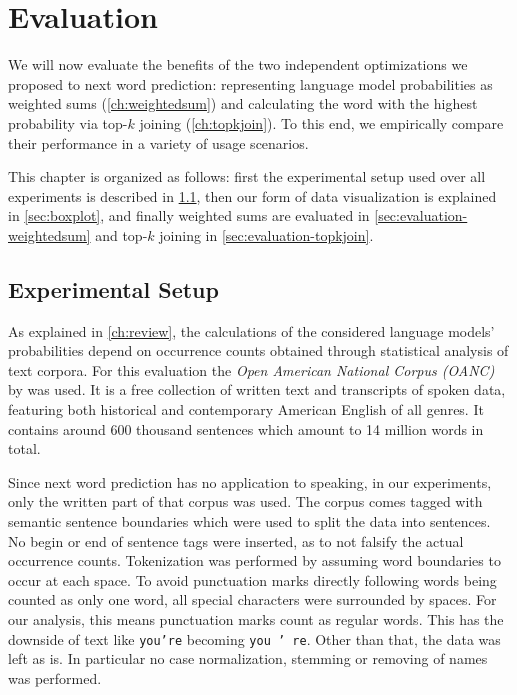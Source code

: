 \chapter{Evaluation}
\label{ch:evaluation}

We will now evaluate the benefits of the two independent optimizations we
proposed to next word prediction: representing language model probabilities as
weighted sums (\cref{ch:weightedsum}) and calculating the word with the highest
probability via top-$k$ joining (\cref{ch:topkjoin}).
To this end, we empirically compare their performance in a variety of usage
scenarios.

This chapter is organized as follows:
first the experimental setup used over all experiments is described in
\cref{sec:experimental-setup}, then our form of data visualization is explained
in \cref{sec:boxplot}, and finally weighted sums are evaluated in
\cref{sec:evaluation-weightedsum} and top-$k$ joining in
\cref{sec:evaluation-topkjoin}.


\section{Experimental Setup}
\label{sec:experimental-setup}

As explained in \cref{ch:review}, the calculations of the considered language
models' probabilities depend on occurrence counts obtained through statistical
analysis of text corpora.
For this evaluation the \emph{Open American National Corpus (OANC)} by
\textcite{OANC} was used.
It is a free collection of written text and transcripts of spoken data,
featuring both historical and contemporary American English of all genres.
It contains around 600 thousand sentences which amount to 14 million words in
total.

Since next word prediction has no application to speaking, in our experiments,
only the written part of that corpus was used.
The corpus comes tagged with semantic sentence boundaries which were used to
split the data into sentences.
No begin or end of sentence tags were inserted, as to not falsify the actual
occurrence counts.
\mbox{Tokenization} was performed by assuming word boundaries to occur at each
space.
To avoid punctuation marks directly following words being counted as only one
word, all special characters were surrounded by spaces.
For our analysis, this means punctuation marks count as regular words.
This has the downside of text like \texttt{you're} becoming \texttt{you ' re}.
Other than that, the data was left as is.
In particular no case normalization, stemming or removing of names was
performed.

